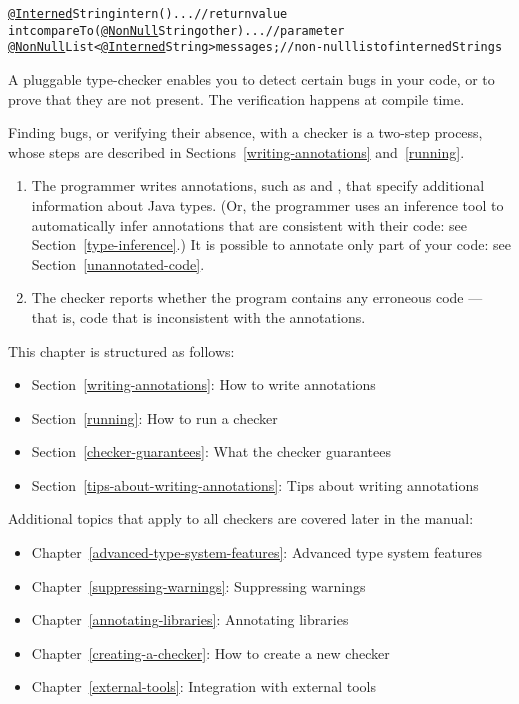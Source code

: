 \begin{alltt}
  \underline{@Interned} String intern() \ttlcb{} ... \ttrcb{}             // return value
  int compareTo(\underline{@NonNull} String other) \ttlcb{} ... \ttrcb{}  // parameter
  \underline{@NonNull} List<\underline{@Interned} String> messages;     // non-null list of interned Strings
\end{alltt}


\htmlhr
{}

A pluggable type-checker enables you to detect certain bugs in your code,
or to prove that they are not present.  The verification happens at compile
time.


Finding bugs, or verifying their absence, with a checker is a two-step process, whose steps are
described in Sections~\ref{writing-annotations} and~\ref{running}.

\begin{enumerate}

\item The programmer writes annotations, such as  and
  , that specify additional information about Java types.
  (Or, the programmer uses an inference tool to automatically infer
  annotations that are consistent with their code:  see Section~\ref{type-inference}.)
  It is possible to annotate only part of your code:  see
  Section~\ref{unannotated-code}.

\item The checker reports whether the program contains any erroneous code
  --- that is, code that is inconsistent with the annotations.

\end{enumerate}

This chapter is structured as follows:
\begin{itemize}
\item Section~\ref{writing-annotations}: How to write annotations
\item Section~\ref{running}:  How to run a checker
\item Section~\ref{checker-guarantees}: What the checker guarantees
\item Section~\ref{tips-about-writing-annotations}: Tips about writing annotations
\end{itemize}

Additional topics that apply to all checkers are covered later in the manual:
\begin{itemize}
\item Chapter~\ref{advanced-type-system-features}: Advanced type system features
\item Chapter~\ref{suppressing-warnings}: Suppressing warnings
\item Chapter~\ref{annotating-libraries}: Annotating libraries
\item Chapter~\ref{creating-a-checker}: How to create a new checker
\item Chapter~\ref{external-tools}: Integration with external tools
\end{itemize}


